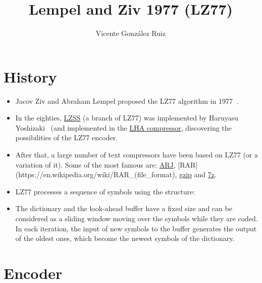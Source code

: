 \title{Lempel and Ziv 1977 (LZ77)}
\author{Vicente González Ruiz}
\maketitle
\tableofcontents

\section{History}
\begin{itemize}
\tightlist
\item
  Jacov Ziv and Abraham Lempel proposed the LZ77 algorithm in 1977~\cite{ziv1977universal}.
\item
  In the eighties,
  \href{https://en.wikipedia.org/wiki/Lempel\%E2\%80\%93Ziv\%E2\%80\%93Storer\%E2\%80\%93Szymanski}{LZSS}
  (a branch of LZ77) was implemented by Haruyasu Yoshizaki~\cite{storer1982data} (and implemented in the
  \href{https://en.wikipedia.org/wiki/LHA_(file_format)}{LHA
  compressor}, discovering the possibilities of the LZ77 encoder.
\item
  After that, a large number of text compressors have been based on LZ77
  (or a variation of it). Some of the most famous are:
  \href{https://en.wikipedia.org/wiki/ARJ}{ARJ},
  {[}RAR{]}(https://en.wikipedia.org/wiki/RAR\_(file\_format),
  \href{https://en.wikipedia.org/wiki/Gzip}{gzip} and
  \href{https://en.wikipedia.org/wiki/7z}{7z}.
\item
  LZ77 processes a sequence of symbols using the structure:
\end{itemize}


\begin{itemize}
\tightlist
\item
  The dictionary and the look-ahead buffer have a fixed size and can be
  considered as a sliding window moving over the symbols while they are
  coded. In each iteration, the input of new symbols to the buffer
  generates the output of the oldest ones, which become the newest
  symbols of the dictionary.
\end{itemize}

\section{Encoder}

